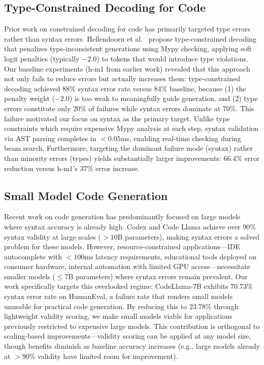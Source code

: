 \subsection{Type-Constrained Decoding for Code}

Prior work on constrained decoding for code has primarily targeted type errors rather than syntax errors. Hellendoorn et al.\ \cite{Hellendoorn2019} propose type-constrained decoding that penalizes type-inconsistent generations using Mypy checking, applying soft logit penalties (typically $-2.0$) to tokens that would introduce type violations. Our baseline experiments (h-m1 from earlier work) revealed that this approach not only fails to reduce errors but actually increases them: type-constrained decoding achieved 88\% syntax error rate versus 84\% baseline, because (1) the penalty weight ($-2.0$) is too weak to meaningfully guide generation, and (2) type errors constitute only 20\% of failures while syntax errors dominate at 70\%. This failure motivated our focus on syntax as the primary target. Unlike type constraints which require expensive Mypy analysis at each step, syntax validation via AST parsing completes in $<0.05$ms, enabling real-time checking during beam search. Furthermore, targeting the dominant failure mode (syntax) rather than minority errors (types) yields substantially larger improvements: 66.4\% error reduction versus h-m1's 37\% error increase.

\subsection{Small Model Code Generation}

Recent work on code generation has predominantly focused on large models where syntax accuracy is already high. Codex \cite{Chen2021} and Code Llama \cite{Roziere2023} achieve over 90\% syntax validity at large scales ($>10$B parameters), making syntax errors a solved problem for these models. However, resource-constrained applications---IDE autocomplete with $<100$ms latency requirements, educational tools deployed on consumer hardware, internal automation with limited GPU access---necessitate smaller models ($\leq$7B parameters) where syntax errors remain prevalent. Our work specifically targets this overlooked regime: CodeLlama-7B exhibits 70.73\% syntax error rate on HumanEval, a failure rate that renders small models unusable for practical code generation. By reducing this to 23.78\% through lightweight validity scoring, we make small models viable for applications previously restricted to expensive large models. This contribution is orthogonal to scaling-based improvements---validity scoring can be applied at any model size, though benefits diminish as baseline accuracy increases (e.g., large models already at $>90$\% validity have limited room for improvement).

